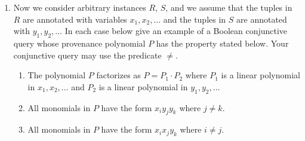 \documentclass[12pt]{article}
\newcounter{query}
\begin{document}
\begin{enumerate}


\item Now we consider arbitrary instances $R$, $S$, and we assume that
  the tuples in $R$ are annotated with variables $x_1, x_2, \ldots$
  and the tuples in $S$ are annotated with $y_1, y_2, \ldots$ In each
  case below give an example of a Boolean conjunctive query whose
  provenance polynomial $P$ has the property stated below.  Your
  conjunctive query may use the predicate $\neq$.

  \begin{enumerate}
  \item The polynomial $P$ factorizes as $P = P_1 \cdot P_2$ where
    $P_1$ is a linear polynomial in $x_1, x_2, \ldots$ and $P_2$ is a
    linear polynomial in $y_1, y_2, \ldots$
  \item All monomials in $P$ have the form $x_i y_j y_k$ where $j\neq
    k$.
  \item All monomials in $P$ have the form $x_i x_j y_k$ where $i \neq
    j$.
  \end{enumerate}

\end{enumerate}



\end{document}
